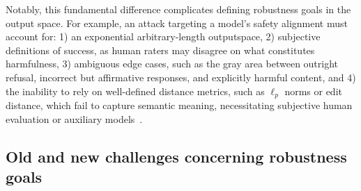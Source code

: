 
Notably, this fundamental difference complicates defining robustness goals in the output space. For example, an attack targeting a model's safety alignment must account for: 1) an exponential arbitrary-length outputspace, 2) subjective definitions of success, as human raters may disagree on what constitutes harmfulness, 3) ambiguous edge cases, such as the gray area between outright refusal, incorrect but affirmative responses, and explicitly harmful content, and 4) the inability to rely on well-defined distance metrics, such as $\ell_p$ norms or edit distance, which fail to capture semantic meaning, necessitating subjective human evaluation or auxiliary models~\cite{zou2023universal, mazeika2024harmbench}. 

\vspace{-5pt}
\subsection{Old and new challenges concerning robustness goals}\label{sec:pos-goals-challenges}


